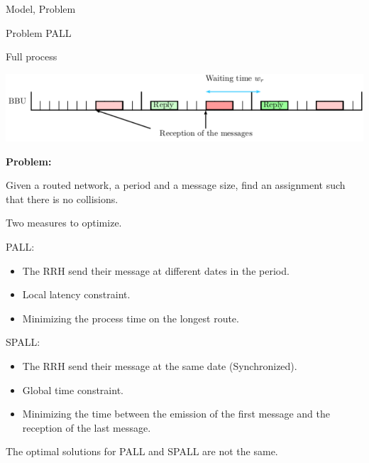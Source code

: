 \documentclass[10 pt]{beamer}
\begin{document}
\begin{section}{Model, Problem}
\begin{subsection}{Problem PALL}
\begin{frame}{Full process}
\begin{center}
  \includegraphics[scale=0.7]{BBU}\\
 \end{center} 

\textbf{Problem:}

Given a routed network, a period and a message size, find an assignment such that there is no collisions.
\end {frame}
\begin{frame}
Two measures to optimize.
 \begin{multicols}{2}
PALL:
\begin{itemize}
\item The RRH send their message at different dates in the period.
\item Local latency constraint.
\item Minimizing the process time on the longest route.
\end{itemize}
\vspace{0.5cm}
SPALL:
\begin{itemize}
\item The RRH send their message at the same date (Synchronized).
\item Global time constraint.
\item Minimizing the time between the emission of the first message and the reception of the last message.
\end{itemize}
\end{multicols}

The optimal solutions for PALL and SPALL are not the same.
\end{frame}
\end{subsection}


\end{section}
\end{document}
